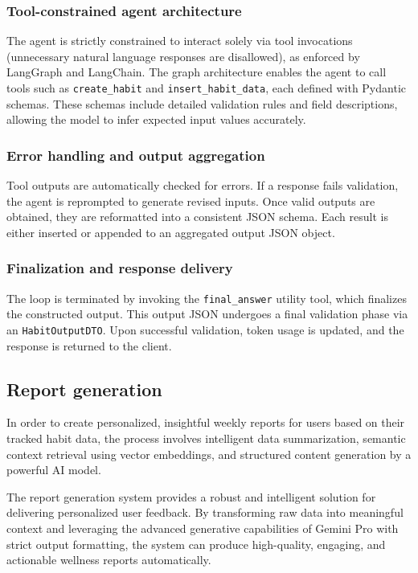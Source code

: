 \documentclass{article}
\begin{document}
\subsubsection{Tool-constrained agent architecture}

The agent is strictly constrained to interact solely via tool invocations (unnecessary natural language responses are disallowed), as enforced by LangGraph and LangChain.
The graph architecture enables the agent to call tools such as \verb|create_habit| and \verb|insert_habit_data|, each defined with Pydantic schemas.
These schemas include detailed validation rules and field descriptions, allowing the model to infer expected input values accurately.

\subsubsection{Error handling and output aggregation}

Tool outputs are automatically checked for errors.
If a response fails validation, the agent is reprompted to generate revised inputs.
Once valid outputs are obtained, they are reformatted into a consistent JSON schema.
Each result is either inserted or appended to an aggregated output JSON object.

\subsubsection{Finalization and response delivery}

The loop is terminated by invoking the \verb|final_answer| utility tool, which finalizes the constructed output.
This output JSON undergoes a final validation phase via an \verb|HabitOutputDTO|.
Upon successful validation, token usage is updated, and the response is returned to the client.

\subsection{Report generation}

In order to create personalized, insightful weekly reports for users based on their tracked habit data, the process involves intelligent data summarization, semantic context retrieval using vector embeddings, and structured content generation by a powerful AI model.

The report generation system provides a robust and intelligent solution for delivering personalized user feedback.
By transforming raw data into meaningful context and leveraging the advanced generative capabilities of Gemini Pro with strict output formatting, the system can produce high-quality, engaging, and actionable wellness reports automatically.
\end{document}
